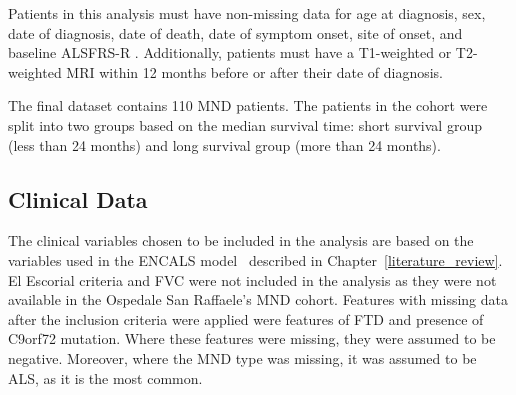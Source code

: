 Patients in this analysis must have non-missing data for age at diagnosis, sex, date of diagnosis, date of death, date of symptom onset, site of onset, and baseline ALSFRS-R .
Additionally, patients must have a T1-weighted or T2-weighted MRI within 12 months before or after their date of diagnosis.

The final dataset contains 110 MND patients.
The patients in the cohort were split into two groups based on the median survival time: short survival group (less than 24 months) and long survival group (more than 24 months).

\subsection{Clinical Data}

The clinical variables chosen to be included in the analysis are based on the variables used in the ENCALS model~\cite{westenengPrognosisPatientsAmyotrophic2018} described in Chapter~\ref{literature_review}.
El Escorial criteria and FVC were not included in the analysis as they were not available in the Ospedale San Raffaele's MND cohort.
Features with missing data after the inclusion criteria were applied were features of FTD and presence of C9orf72 mutation.
Where these features were missing, they were assumed to be negative.
Moreover, where the MND type was missing, it was assumed to be ALS, as it is the most common.

